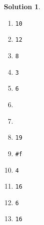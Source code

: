 \documentclass[11pt]{article}
\theoremstyle{definition}
\newcommand{\inline}{\texttt}
\newtheorem{sol}{Solution}[section]
\begin{document}
\begin{sol}
    \begin{enumerate}[label=\alph*.]
        \item \inline{10}
        \item \inline{12}
        \item \inline{8}
        \item \inline{3}
        \item \inline{6}
        \item \inline{ }
        \item \inline{ }
        \item \inline{19}
        \item \inline{#f}
        \item \inline{4}
        \item \inline{16}
        \item \inline{6}
        \item \inline{16}
    \end{enumerate}
\end{sol}
\end{document}
